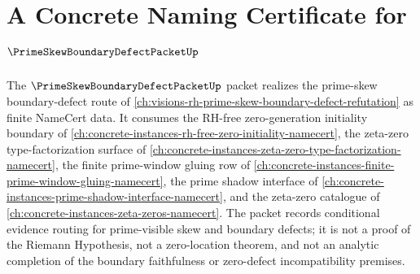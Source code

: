 \chapter{A Concrete Naming Certificate for $\PrimeSkewBoundaryDefectPacketUp$}
\label{ch:concrete-instances-prime-skew-boundary-defect-packet-namecert}

The $\PrimeSkewBoundaryDefectPacketUp$ packet realizes the prime-skew boundary-defect route of \autoref{ch:visions-rh-prime-skew-boundary-defect-refutation} as finite NameCert data. It consumes the RH-free zero-generation initiality boundary of \autoref{ch:concrete-instances-rh-free-zero-initiality-namecert}, the zeta-zero type-factorization surface of \autoref{ch:concrete-instances-zeta-zero-type-factorization-namecert}, the finite prime-window gluing row of \autoref{ch:concrete-instances-finite-prime-window-gluing-namecert}, the prime shadow interface of \autoref{ch:concrete-instances-prime-shadow-interface-namecert}, and the zeta-zero catalogue of \autoref{ch:concrete-instances-zeta-zeros-namecert}. The packet records conditional evidence routing for prime-visible skew and boundary defects; it is not a proof of the Riemann Hypothesis, not a zero-location theorem, and not an analytic completion of the boundary faithfulness or zero-defect incompatibility premises.

